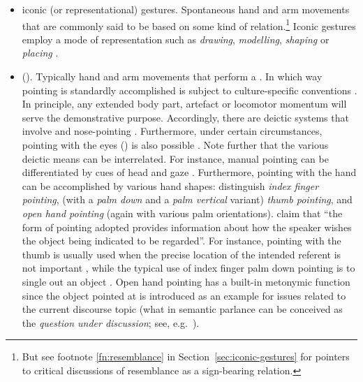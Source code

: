 \documentclass[output=paper]{langsci/langscibook}
\begin{document}
\begin{itemize}
\item iconic (or representational)   gestures. Spontaneous hand and arm movements that are commonly said to be based on some kind of   relation.\footnote{But see footnote \ref{fn:resemblance} in Section~\ref{sec:iconic-gestures} for pointers to critical discussions of resemblance as a sign-bearing relation.} Iconic gestures employ a mode of representation such as \textit{drawing}, \textit{modelling}, \textit{shaping} or \textit{placing} \citep{Streeck:2008,Mueller:1998}.
\item {} (). Typically hand and arm movements that perform a . 
%
In which way pointing is standardly accomplished is subject to culture-specific conventions \citep{Wilkins:2003}. 
%
In principle, any extended body part, artefact or locomotor momentum will serve the demonstrative purpose. 
%
Accordingly, there are deictic systems that involve  \citep{Enfield:2001} and nose-pointing \citep{Cooperrider:Nunez:2012}. 
%
Furthermore, under certain circumstances, pointing with the eyes () is also possible \citep{Hadjikhani:Hoge:Snyder:de:Gelder:2008}. 
%
Note further that the various deictic means can be interrelated. For instance, manual pointing can be differentiated by cues of head and gaze \citep{Butterworth:Itakura:2000}.
%
Furthermore, pointing with the hand can be accomplished by various hand shapes: \citet{Kendon:Versante:2003} distinguish \emph{index finger pointing},  (with a \emph{palm down}  and a \emph{palm vertical}  variant) \emph{thumb pointing},  and \emph{open hand pointing}  (again with various palm orientations).
%
\citet[]{Kendon:Versante:2003} claim that \enquote{the form of pointing adopted provides information about how the speaker wishes the object being indicated to be regarded}.
%
For instance, pointing with the thumb is usually used when the precise location of the intended referent is not important \citep[--125]{Kendon:Versante:2003}, while the typical use of index finger palm down pointing is to single out an object \citep[]{Kendon:Versante:2003}. 
%
Open hand pointing has a built-in metonymic function since the object pointed at is introduced as an example for issues related to the current discourse topic (what in semantic parlance can be conceived as the \emph{question under discussion}; see, e.g.\ \citealp{Ginzburg:2012}).

\end{itemize}
\end{document}
